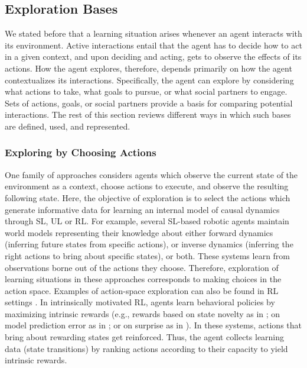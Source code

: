 \subsection{Exploration Bases}\label{CH3_SS_exploration_bases}
We stated before that a learning situation arises whenever an agent interacts with its environment. Active interactions entail that the agent has to decide how to act in a given context, and upon deciding and acting, gets to observe the effects of its actions. How the agent explores, therefore, depends primarily on how the agent contextualizes its interactions. Specifically, the agent can explore by considering what actions to take, what goals to pursue, or what social partners to engage. Sets of actions, goals, or social partners provide a basis for comparing potential interactions. The rest of this section reviews different ways in which such bases are defined, used, and represented.

\subsubsection{Exploring by Choosing Actions}\label{CH3_SSS_exploring_by_choosing_actions}
One family of approaches considers agents which observe the current state of the environment as a context, choose actions to execute, and observe the resulting following state. Here, the objective of exploration is to select the actions which generate informative data for learning an internal model of causal dynamics through SL, UL or RL. For example, several SL-based robotic agents \parencite{oudeyer_intrinsic_2007,caligiore_using_2008,baranes_r-iac_2009,saegusa_active_2009,lefort_active_2015} maintain world models representing their knowledge about either forward dynamics (inferring future states from specific actions), or inverse dynamics (inferring the right actions to bring about specific states), or both. These systems learn from observations borne out of the actions they choose. Therefore, exploration of learning situations in these approaches corresponds to making choices in the action space. Examples of action-space exploration can also be found in RL settings \parencite{singh_intrinsically_2010,bellemare_unifying_2016,jaderberg_reinforcement_2016,pathak_curiosity-driven_2017,tang_exploration_2017,burda_large-scale_2018,haber_learning_2018,bougie_fast_2020}. In intrinsically motivated RL, agents learn behavioral policies by maximizing intrinsic rewards (e.g., rewards based on state novelty as in \parencite{tang_exploration_2017}; on model prediction error as in \parencite{pathak_curiosity-driven_2017}; or on surprise as in \parencite{berseth_smirl_2021}). In these systems, actions that bring about rewarding states get reinforced. Thus, the agent collects learning data (state transitions) by ranking actions according to their capacity to yield intrinsic rewards. 

